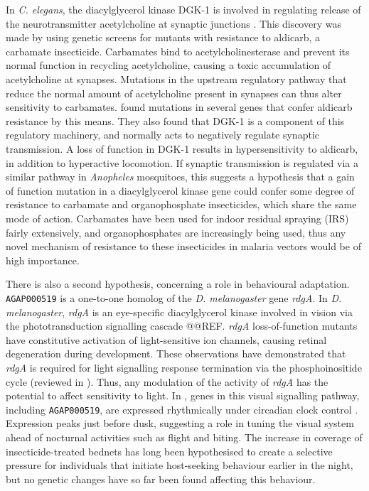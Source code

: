 \documentclass[a4paper,11pt,abstracton,hidelinks]{scrartcl}
\begin{document}
In \textit{C. elegans}, the diacylglycerol kinase DGK-1 is involved in regulating release of the neurotransmitter acetylcholine at synaptic junctions \parencite{Miller1999}.
%
This discovery was made by using genetic screens for mutants with resistance to aldicarb, a carbamate insecticide.
%
Carbamates bind to acetylcholinesterase and prevent its normal function in recycling acetylcholine, causing a toxic accumulation of acetylcholine at synapses.
%
Mutations in the upstream regulatory pathway that reduce the normal amount of acetylcholine present in synapses can thus alter sensitivity to carbamates.
%
\textcite{Miller1999} found mutations in several genes that confer aldicarb resistance by this means.
%
They also found that DGK-1 is a component of this regulatory machinery, and normally acts to negatively regulate synaptic transmission.
%
A loss of function in DGK-1 results in hypersensitivity to aldicarb, in addition to hyperactive locomotion.
%
If synaptic transmission is regulated via a similar pathway in \textit{Anopheles} mosquitoes, this suggests a hypothesis that a gain of function mutation in a diacylglycerol kinase gene could confer some degree of resistance to carbamate and organophosphate insecticides, which share the same mode of action.
%
Carbamates have been used for indoor residual spraying (IRS) fairly extensively, and organophosphates are increasingly being used, thus any novel mechanism of resistance to these insecticides in malaria vectors would be of high importance.


There is also a second hypothesis, concerning a role in behavioural adaptation.
%
\texttt{AGAP000519} is a one-to-one homolog of the \textit{D. melanogaster} gene \textit{rdgA}.
%
In \textit{D. melanogaster}, \textit{rdgA} is an eye-specific diacylglycerol kinase involved in vision via the phototransduction signalling cascade @@REF.
%
\textit{rdgA} loss-of-function mutants have constitutive activation of light-sensitive ion channels, causing retinal degeneration during development.
%
These observations have demonstrated that \textit{rdgA} is required for light signalling response termination via the phosphoinositide cycle (reviewed in \textcite{Katz2009}).
%
Thus, any modulation of the activity of \textit{rdgA} has the potential to affect sensitivity to light.
%
In \agam, genes in this visual signalling pathway, including \texttt{AGAP000519}, are expressed rhythmically under circadian clock control \parencite{Rund2011}.
%
Expression peaks just before dusk, suggesting a role in tuning the \agam visual system ahead of nocturnal activities such as flight and biting.
%
The increase in coverage of insecticide-treated bednets has long been hypothesised to create a selective pressure for individuals that initiate host-seeking behaviour earlier in the night, but no genetic changes have so far been found affecting this behaviour.
%
\end{document}
